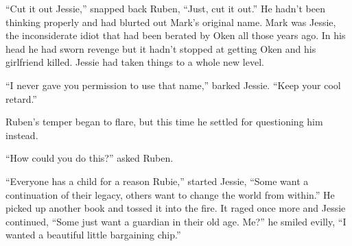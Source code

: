 ``Cut it out Jessie,'' snapped back Ruben, ``Just, cut it out.''  He hadn't been thinking properly and had blurted out Mark's original name.  Mark was Jessie, the inconsiderate idiot that had been berated by Oken all those years ago.  In his head he had sworn revenge but it hadn't stopped at getting Oken and his girlfriend killed.  Jessie had taken things to a whole new level.  

``I never gave you permission to use that name,'' barked Jessie.  ``Keep your cool retard.''

Ruben's temper began to flare, but this time he settled for questioning him instead.

``How could you do this?'' asked Ruben.

``Everyone has a child for a reason Rubie,'' started Jessie, ``Some want a continuation of their legacy, others want to change the world from within.''  He picked up another book and tossed it into the fire.  It raged once more and Jessie continued, ``Some just want a guardian in their old age.  Me?'' he smiled evilly, ``I wanted a beautiful little bargaining chip.''





